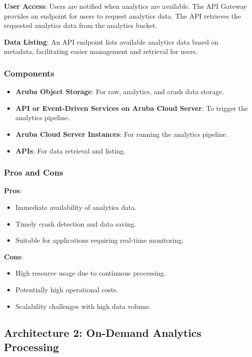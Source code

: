 \textbf{User Access}:  
Users are notified when analytics are available. The API Gateway provides an endpoint for users to request analytics data. The API retrieves the requested analytics data from the analytics bucket.

\textbf{Data Listing}:  
An API endpoint lists available analytics data based on metadata, facilitating easier management and retrieval for users.

\subsubsection{Components}
\begin{itemize}
    \item \textbf{Aruba Object Storage}: For raw, analytics, and crash data storage.
    \item \textbf{API or Event-Driven Services on Aruba Cloud Server}: To trigger the analytics pipeline.
    \item \textbf{Aruba Cloud Server Instances}: For running the analytics pipeline.
    \item \textbf{APIs}: For data retrieval and listing.
\end{itemize}

\subsubsection{Pros and Cons}

\textbf{Pros}:
\begin{itemize}
    \item Immediate availability of analytics data.
    \item Timely crash detection and data saving.
    \item Suitable for applications requiring real-time monitoring.
\end{itemize}

\textbf{Cons}:
\begin{itemize}
    \item High resource usage due to continuous processing.
    \item Potentially high operational costs.
    \item Scalability challenges with high data volume.
\end{itemize}

\subsection{Architecture 2: On-Demand Analytics Processing}

